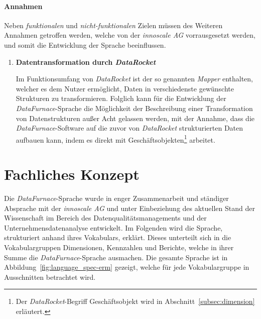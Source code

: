\documentclass[
  language=german, %
  type=bachelor,%
  ngerman
]{isthesis}
\begin{document}
\begin{content}
\begin{enumerate}
    \end{enumerate}

	\paragraph{Annahmen} Neben \textit{funktionalen} und
	\textit{nicht-funktionalen} Zielen müssen des Weiteren Annahmen getroffen
	werden, welche von der \textit{innoscale AG} vorrausgesetzt werden, und somit
	die Entwicklung der Sprache beeinflussen.

  \begin{enumerate}
    \item \textbf{Datentransformation durch \textit{DataRocket}}

      Im Funktionsumfang von \textit{DataRocket} ist der so genannten
      \textit{Mapper} enthalten, welcher es dem Nutzer ermöglicht, Daten in
      verschiedenste gewünschte Strukturen zu transformieren. Folglich kann für
      die Entwicklung der \textit{DataFurnace}-Sprache die Möglichkeit der
      Beschreibung einer Transformation von Datenstrukturen außer Acht gelassen
      werden, mit der Annahme, dass die \textit{DataFurnace}-Software auf die
      zuvor von \textit{DataRocket} strukturierten Daten aufbauen kann, indem
      es direkt mit Geschäftsobjekten\footnote{Der \textit{DataRocket}-Begriff
      Geschäftsobjekt wird in Abschnitt~\ref{subsec:dimension} erläutert.}
      arbeitet.


  \end{enumerate}


  \section{Fachliches Konzept}

  Die \textit{DataFurnace}-Sprache wurde in enger Zusammenarbeit und ständiger
  Absprache mit der \textit{innoscale AG} und unter Einbeziehung des
  aktuellen Stand der Wissenschaft im Bereich des Datenqualitätsmanagements und
  der Unternehmensdatenanalyse entwickelt. Im Folgenden wird die Sprache,
  strukturiert anhand ihres Vokabulars, erklärt. Dieses unterteilt sich in die
  Vokabulargruppen Dimensionen, Kennzahlen und Berichte, welche in ihrer Summe
  die \textit{DataFurnace}-Sprache ausmachen. Die gesamte Sprache ist in
  Abbildung~\ref{fig:language_spec-erm} gezeigt, welche für jede
  Vokabulargruppe in Ausschnitten betrachtet wird.


\end{content}
\end{document}
